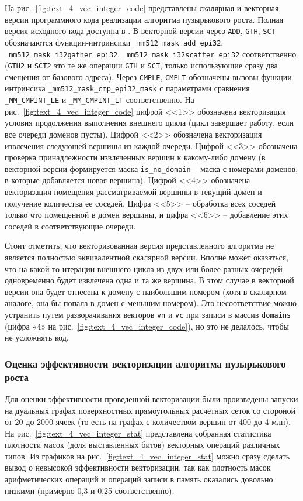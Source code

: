 На рис.~\ref{fig:text_4_vec_integer_code} представлены скалярная и векторная версии программного кода реализации алгоритма пузырькового роста.
Полная версия исходного кода доступна в \cite{comboptGithub}.
В векторной версии через \texttt{ADD}, \texttt{GTH}, \texttt{SCT} обозначаются функции-интринсики \texttt{\_mm512\_mask\_add\_epi32}, \texttt{\_mm512\_mask\_i32gather\_epi32}, \texttt{\_mm512\_mask\_i32scatter\_epi32} соответственно (\texttt{GTH2} и \texttt{SCT2} это те же операции \texttt{GTH} и \texttt{SCT}, только использующие сразу два смещения от базового адреса).
Через \texttt{CMPLE}, \texttt{CMPLT} обозначены вызовы функции-интринсика \texttt{\_mm512\_mask\_cmp\_epi32\_mask} с параметрами сравнения \texttt{\_MM\_CMPINT\_LE} и \texttt{\_MM\_CMPINT\_LT} соответственно.
На рис.~\ref{fig:text_4_vec_integer_code} цифрой <<1>> обозначена векторизация условия продолжения выполнения внешнего цикла (цикл завершает работу, если все очереди доменов пусты).
Цифрой <<2>> обозначена векторизация извлечения следующей вершины из каждой очереди.
Цифрой <<3>> обозначена проверка принадлежности извлеченных вершин к какому-либо домену (в векторной версии формируется маска \texttt{is\_no\_domain} -- маска с номерами доменов, в которые добавляется новая вершина).
Цифрой <<4>> обозначена векторизация помещения рассматриваемой вершины в текущий домен и получение количества ее соседей. 
Цифра <<5>> -- обработка всех соседей только что помещенной в домен вершины, и цифра <<6>> -- добавление этих соседей в соответствующие очереди.

Стоит отметить, что векторизованная версия представленного алгоритма не является полностью эквивалентной скалярной версии. 
Вполне может оказаться, что на какой-то итерации внешнего цикла из двух или более разных очередей одновременно будет извлечена одна и та же вершина.
В этом случае в векторной версии она будет отнесена к домену с наибольшим номером (хотя в скалярном аналоге, она бы попала в домен с меньшим номером).
Это несоответствие можно устранить путем разворачивания векторов \texttt{vn} и \texttt{vc} при записи в массив \texttt{domains} (цифра «4» на рис.~\ref{fig:text_4_vec_integer_code}), но это не делалось, чтобы не усложнять код.

\subsubsection{Оценка эффективности векторизации алгоритма пузырькового роста}

Для оценки эффективности проведенной векторизации были произведены запуски на дуальных графах поверхностных прямоугольных расчетных сеток со стороной от 20 до 2000 ячеек (то есть на графах с количеством вершин от 400 до 4 млн).
На рис.~\ref{fig:text_4_vec_integer_stat} представлена собранная статистика плотности масок (доля выставленных битов) векторных операций различных типов.
Из графиков на рис.~\ref{fig:text_4_vec_integer_stat} можно сразу сделать вывод о невысокой эффективности векторизации, так как плотность масок арифметических операций и операций записи в память оказались довольно низкими (примерно 0,3 и 0,25 соответственно).

